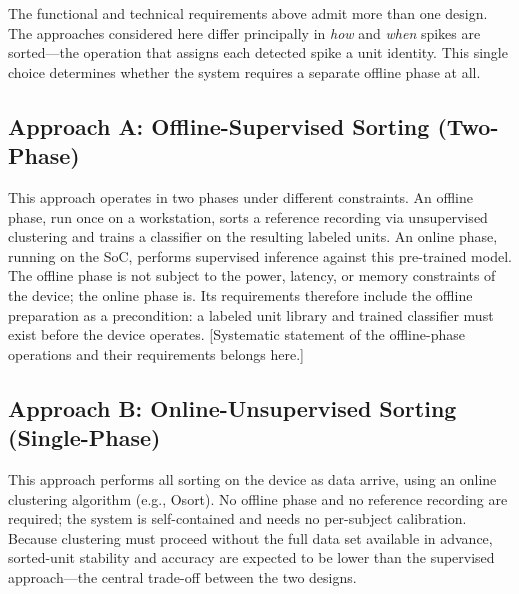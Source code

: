 \documentclass[11pt]{article}
\begin{document}
The functional and technical requirements above admit more than one design. The
approaches considered here differ principally in \emph{how} and \emph{when} spikes are
sorted---the operation that assigns each detected spike a unit identity. This single
choice determines whether the system requires a separate offline phase at all.

\subsection*{Approach A: Offline-Supervised Sorting (Two-Phase)}
This approach operates in two phases under different constraints. An offline phase,
run once on a workstation, sorts a reference recording via unsupervised clustering and
trains a classifier on the resulting labeled units. An online phase, running on the
SoC, performs supervised inference against this pre-trained model. The offline phase
is not subject to the power, latency, or memory constraints of the device; the online
phase is. Its requirements therefore include the offline preparation as a
precondition: a labeled unit library and trained classifier must exist before the
device operates. [Systematic statement of the offline-phase operations and their
requirements belongs here.]

\subsection*{Approach B: Online-Unsupervised Sorting (Single-Phase)}
This approach performs all sorting on the device as data arrive, using an online
clustering algorithm (e.g., Osort). No offline phase and no reference recording are
required; the system is self-contained and needs no per-subject calibration. Because
clustering must proceed without the full data set available in advance, sorted-unit
stability and accuracy are expected to be lower than the supervised approach---the
central trade-off between the two designs.

\end{document}
